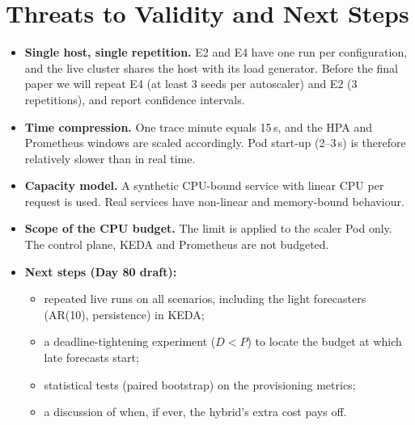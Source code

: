 \documentclass[11pt,a4paper]{article}
\begin{document}
\section{Threats to Validity and Next Steps}
\begin{itemize}
\item \textbf{Single host, single repetition.} E2 and E4 have one run per configuration, and the live cluster
      shares the host with its load generator. Before the final paper we will repeat E4 (at least 3 seeds per
      autoscaler) and E2 (3 repetitions), and report confidence intervals.
\item \textbf{Time compression.} One trace minute equals 15\,s, and the HPA and Prometheus windows are scaled
      accordingly. Pod start-up (2--3\,s) is therefore relatively slower than in real time.
\item \textbf{Capacity model.} A synthetic CPU-bound service with linear CPU per request is used. Real services
      have non-linear and memory-bound behaviour.
\item \textbf{Scope of the CPU budget.} The limit is applied to the scaler Pod only. The control plane, KEDA and
      Prometheus are not budgeted.
\item \textbf{Next steps (Day 80 draft):}
      \begin{itemize}
      \item repeated live runs on all scenarios, including the light forecasters (AR(10), persistence) in KEDA;
      \item a deadline-tightening experiment ($D<P$) to locate the budget at which late forecasts start;
      \item statistical tests (paired bootstrap) on the provisioning metrics;
      \item a discussion of when, if ever, the hybrid's extra cost pays off.
      \end{itemize}
\end{itemize}
\end{document}
